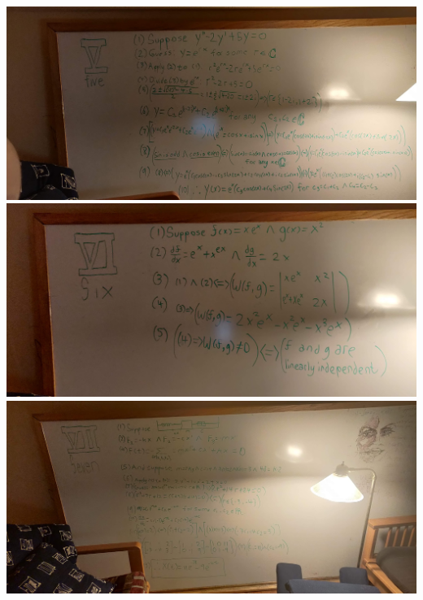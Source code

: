 \documentclass{article}
\begin{document}
\includegraphics[scale=0.075]{5.jpg}
\includegraphics[scale=0.075]{6.jpg}
\includegraphics[scale=0.075]{7.jpg}
\end{document}
